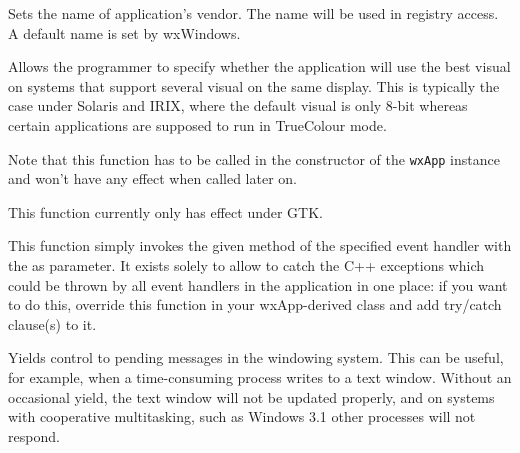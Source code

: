 \label{wxappsetvendorname}


Sets the name of application's vendor. The name will be used
in registry access. A default name is set by
wxWindows.




\label{wxappsetusebestvisual}


Allows the programmer to specify whether the application will use the best visual
on systems that support several visual on the same display. This is typically the
case under Solaris and IRIX, where the default visual is only 8-bit whereas certain
applications are supposed to run in TrueColour mode.

Note that this function has to be called in the constructor of the {\tt wxApp} 
instance and won't have any effect when called later on.

This function currently only has effect under GTK.




\label{wxapphandleevent}


This function simply invokes the given method  of the specified
event handler  with the  as parameter. It exists solely
to allow to catch the C++ exceptions which could be thrown by all event
handlers in the application in one place: if you want to do this, override this
function in your wxApp-derived class and add try/catch clause(s) to it.


\label{wxappyield}


Yields control to pending messages in the windowing system. This can be useful, for example, when a
time-consuming process writes to a text window. Without an occasional
yield, the text window will not be updated properly, and on systems with
cooperative multitasking, such as Windows 3.1 other processes will not respond.

